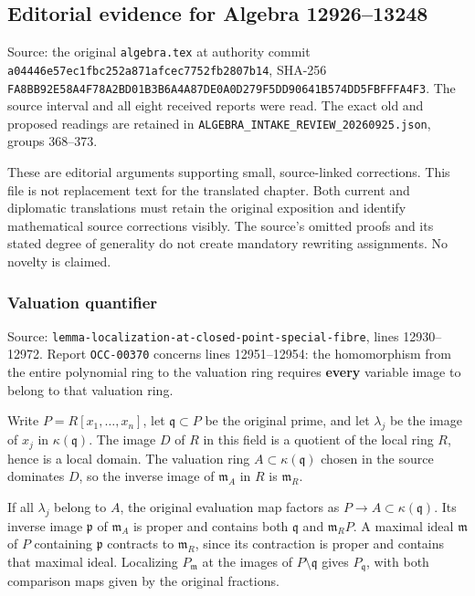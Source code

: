 \subsection{Editorial evidence for Algebra 12926--13248}\label{editorial-evidence-for-algebra-1292613248}

Source: the original \texttt{algebra.tex} at authority commit \texttt{a04446e57ec1fbc252a871afcec7752fb2807b14}, SHA-256 \texttt{FA8BB92E58A4F78A2BD01B3B6A4A87DE0A0D279F5DD90641B574DD5FBFFFA4F3}. The source interval and all eight received reports were read. The exact old and proposed readings are retained in \texttt{ALGEBRA\_INTAKE\_REVIEW\_20260925.json}, groups 368--373.

These are editorial arguments supporting small, source-linked corrections. This file is not replacement text for the translated chapter. Both current and diplomatic translations must retain the original exposition and identify mathematical source corrections visibly. The source's omitted proofs and its stated degree of generality do not create mandatory rewriting assignments. No novelty is claimed.

\subsubsection{Valuation quantifier}\label{valuation-quantifier}

Source: \texttt{lemma-localization-at-closed-point-special-fibre}, lines 12930--12972. Report \texttt{OCC-00370} concerns lines 12951--12954: the homomorphism from the entire polynomial ring to the valuation ring requires \textbf{every} variable image to belong to that valuation ring.

Write \(P=R[x_1,\ldots,x_n]\), let \(\mathfrak q\subset P\) be the original prime, and let \(\lambda_j\) be the image of \(x_j\) in \(\kappa(\mathfrak q)\). The image \(D\) of \(R\) in this field is a quotient of the local ring \(R\), hence is a local domain. The valuation ring \(A\subset\kappa(\mathfrak q)\) chosen in the source dominates \(D\), so the inverse image of \(\mathfrak m_A\) in \(R\) is \(\mathfrak m_R\).

If all \(\lambda_j\) belong to \(A\), the original evaluation map factors as \(P\to A\subset\kappa(\mathfrak q)\). Its inverse image \(\mathfrak p\) of \(\mathfrak m_A\) is proper and contains both \(\mathfrak q\) and \(\mathfrak m_RP\). A maximal ideal \(\mathfrak m\) of \(P\) containing \(\mathfrak p\) contracts to \(\mathfrak m_R\), since its contraction is proper and contains that maximal ideal. Localizing \(P_{\mathfrak m}\) at the images of \(P\setminus\mathfrak q\) gives \(P_{\mathfrak q}\), with both comparison maps given by the original fractions.

